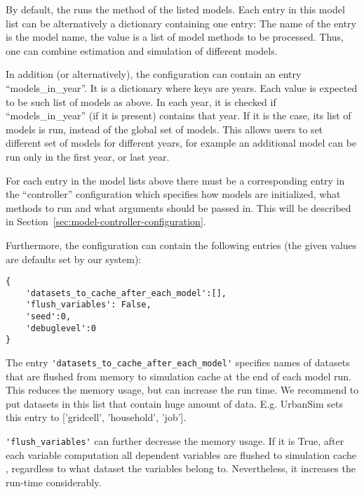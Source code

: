 By default, the  runs the method
 of the listed models. Each entry in this model list can be
alternatively a dictionary containing one entry: The name of the entry is the model
name, the value is a list of model methods to be processed. Thus, one can combine
estimation and simulation of different models. 

In addition (or alternatively), the configuration can contain an entry
``models_in_year''. It is a dictionary where keys are years. Each value is
expected to be such list of models as above. In each year, it is checked if
``models_in_year'' (if it is present) contains that year. If it is the case,
its list of models is run, instead of the global set of models. This allows
users to set different set of models for different years, for example an
additional model can be run only in the first year, or last year.

For each entry in the model lists above there must be a corresponding entry in
the ``controller'' configuration which specifies how models are initialized,
what methods to run and what arguments should be passed in. This will be
described in Section~\ref{sec:model-controller-configuration}.

Furthermore, the configuration can contain the following entries (the given
values are defaults set by our system):
\begin{verbatim}
{
    'datasets_to_cache_after_each_model':[],
    'flush_variables': False,
    'seed':0,
    'debuglevel':0
}
\end{verbatim}

The entry \verb|'datasets_to_cache_after_each_model'| specifies names of datasets that
are flushed from memory to simulation cache \simulationcacheindex at the end of each model
run.  This reduces the memory
usage, but can increase the run time. We recommend to put datasets in this list
that contain huge amount of data. E.g. UrbanSim sets this entry to ['gridcell',
'household', 'job'].

\verb|'flush_variables'| can further decrease the memory usage.  If it is True, after each variable
computation all dependent variables are flushed to simulation
cache \simulationcacheindex, regardless to what dataset the variables belong to.
Nevertheless, it increases the run-time considerably.

